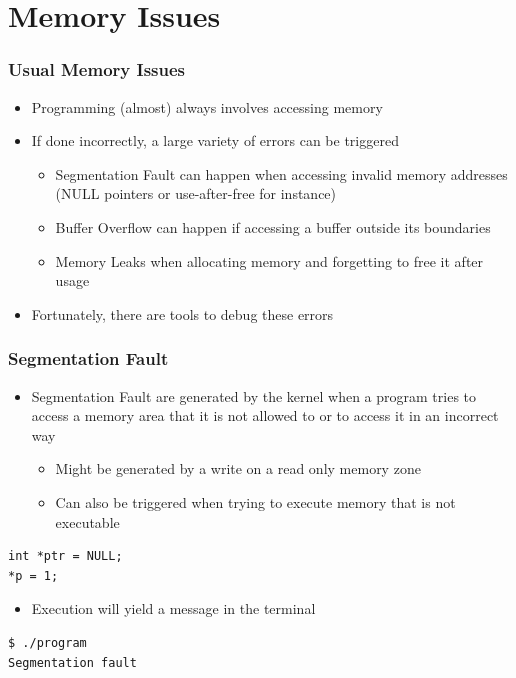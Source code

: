\section{Memory Issues}

\begin{frame}
  \frametitle{Usual Memory Issues}
  \begin{itemize}
    \item Programming (almost) always involves accessing memory
    \item If done incorrectly, a large variety of errors can be triggered
    \begin{itemize}
      \item Segmentation Fault can happen when accessing invalid memory
            addresses (NULL pointers or use-after-free for instance)
      \item Buffer Overflow can happen if accessing a buffer outside its
            boundaries
      \item Memory Leaks when allocating memory and forgetting to free it after
            usage
    \end{itemize}
    \item Fortunately, there are tools to debug these errors
  \end{itemize}
\end{frame}

\begin{frame}[fragile]
  \frametitle{Segmentation Fault}
  \begin{itemize}
    \item Segmentation Fault are generated by the kernel when a program tries to
          access a memory area that it is not allowed to or to access it in an
          incorrect way
    \begin{itemize}
      \item Might be generated by a write on a read only memory zone
      \item Can also be triggered when trying to execute memory that is not
            executable
    \end{itemize}
  \end{itemize}

  \begin{block}{}
    \begin{verbatim}
int *ptr = NULL;
*p = 1;
    \end{verbatim}
  \end{block}

  \begin{itemize}
    \item Execution will yield a  message in the
          terminal
  \end{itemize}
  \vspace{0.2cm}

  \begin{block}{}
    \begin{verbatim}
$ ./program
Segmentation fault
    \end{verbatim}
  \end{block}
\end{frame}

